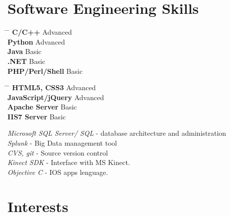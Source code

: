 \documentclass[10pt]{article} %
\begin{document}
\section{Software Engineering Skills}
\parbox{0.5\textwidth}{ %
\begin{tabbing}
\hspace{5cm} \= \hspace{4cm} \= \kill %
{\bf C/C++} \> Advanced \\
{\bf Python} \> Advanced \\
{\bf Java} \> Basic \\ 
{\bf .NET} \> Basic \\
{\bf PHP/Perl/Shell} \> Basic
\end{tabbing}}
\hfill %
\parbox{0.5\textwidth}{ %
\begin{tabbing}
\hspace{5cm} \= \hspace{4cm} \= \kill %
{\bf HTML5, CSS3} \> Advanced \\
{\bf JavaScript/jQuery} \> Advanced \\
{\bf Apache Server} \> Basic \\ 
{\bf IIS7 Server} \> Basic
\end{tabbing}}


{
\textit{Microsoft SQL Server/ SQL} - database architecture and administration\\
\textit{Splunk} - Big Data management tool\\
\textit{CVS, git} - Source version control\\
\textit{Kinect SDK} - Interface with MS Kinect. \\
\textit{Objective C} - IOS apps lenguage.
}


\section{Interests}

\end{document}
